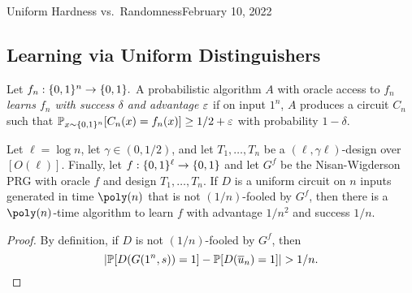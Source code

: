 \begin{lecture}{4}{Uniform Hardness vs.\ Randomness}{February 10, 2022}
\subsection{Learning via Uniform Distinguishers}


\begin{definition}
  Let $f_n : \{0, 1\}^n \to \{0, 1\}.$ A probabilistic algorithm $A$ with
  oracle access to $f_n$ \emph{learns $f_n$ with success $\delta$ and advantage
  $\varepsilon$} if on input $1^n$, $A$ produces a circuit $C_n$ such that
  $\mathbb{P}_{x \sim \{0, 1\}^n} [C_n(x) = f_n(x)] \geq 1/2 + \varepsilon$ with
  probability $1 - \delta$.
\end{definition}

\begin{proposition}\label{prop:learning}
  Let $\ell = \log{n}$, let $\gamma \in (0, 1/2)$, and let $T_1, \dots, T_n$ be
  a $(\ell, \gamma \ell)$-design over $[O(\ell)]$. Finally, let $f :
  \{0,1\}^\ell \to \{0, 1\}$ and let $G^f$ be the Nisan-Wigderson PRG with
  oracle $f$ and design $T_1, \dots, T_n$. If $D$ is a uniform circuit on $n$
  inputs generated in time $\poly(n)$ that is not $(1/n)$-fooled by $G^f$, then
  there is a $\poly(n)$-time algorithm to learn $f$ with advantage $1/n^2$ and
  success $1/n$.
\end{proposition}

\begin{proof}
  By definition, if $D$ is not $(1/n)$-fooled by $G^f$, then
  \[
    \lvert\mathbb{P}[D(G(1^n, s)) = 1] - \mathbb{P}[D(\overline{u}_n) = 1]\rvert > 1/n.
  \]


\end{proof}
\end{lecture}
